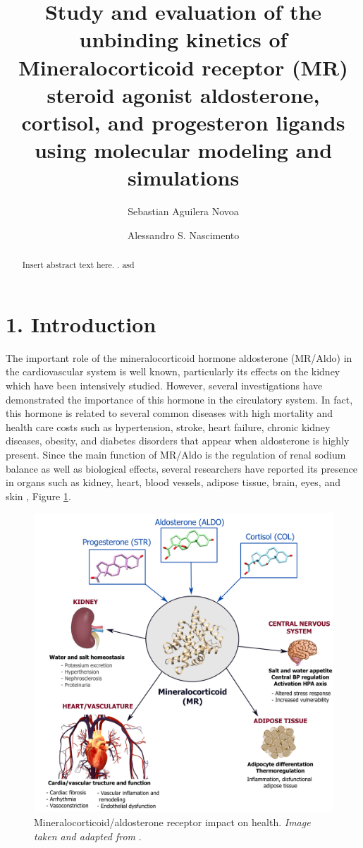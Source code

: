\documentclass[
  journal=usp, %
  manuscript=final-report,
  year=2023,
  volume=1,
]{cup-journal}
\title{Study and evaluation of the unbinding kinetics of Mineralocorticoid receptor (MR) steroid agonist aldosterone, cortisol, and progesteron ligands using molecular modeling and simulations}
\author{Sebastian Aguilera Novoa}
\affiliation{Sao Carlos Institute of Physics, University of Sao Paulo, Brazil}
\author{Alessandro S. Nascimento}
\begin{document}
\begin{abstract}
Insert abstract text here. \vspace{5cm}. asd
\end{abstract}


\section{1. Introduction}

The important role of the mineralocorticoid hormone aldosterone (MR/Aldo) in the cardiovascular system is well known, particularly its effects on the kidney which have been intensively studied. However, several investigations have demonstrated the importance of this hormone in the circulatory system. In fact, this hormone is related to several common diseases with high mortality and health care costs such as hypertension, stroke, heart failure, chronic kidney diseases, obesity, and diabetes disorders that appear when aldosterone is highly present. Since the main function of MR/Aldo is the regulation of renal sodium balance as well as biological effects, several researchers have reported its presence in organs such as kidney, heart, blood vessels, adipose tissue, brain, eyes, and skin \cite{book-MR_AS4, MR-as4_importance}, Figure \ref{MR_functions}.

\begin{figure}[htbp]
\centering
\includegraphics[scale=0.35]{Images/MR-AS4-COL.png}
\caption{Mineralocorticoid/aldosterone receptor impact on health. \textit{Image taken and adapted from} \cite{book-MR_AS4}.}
\label{MR_functions}
\end{figure}
\end{document}
